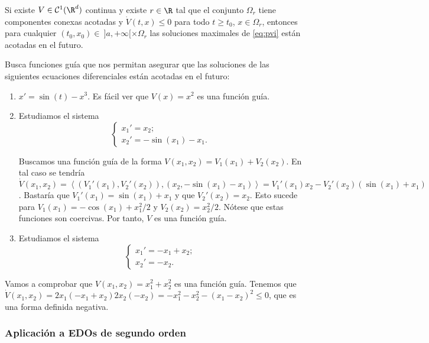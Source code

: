 \documentclass{article}
\begin{document}
\begin{theorem}
  \label{thm:guia:2}
  Si existe $V\in \mathcal{C}^1(\R^d)$ continua y existe $r \in \R$ tal que el conjunto $\Omega_r$
  tiene componentes conexas acotadas y $\dot{V}(t,x) \le 0$ para todo $t \ge t_0$, $x \in \Omega_r$,
  entonces para cualquier $(t_0, x_0) \in \ ]a, +\infty[ \times \Omega_r$ las soluciones maximales
  de \eqref{eq:pvi} están acotadas en el futuro.
\end{theorem}


\begin{ex} 
  Busca funciones guía que nos permitan asegurar que las soluciones de las siguientes ecuaciones
  diferenciales están acotadas en el futuro:
  \begin{enumerate}
  \item $x' = \sin(t) - x^{3}$. Es fácil ver que $V(x) = x^2$ es una función guía.
  \item Estudiamos el sistema
    \[
      \begin{cases}
        x_1' = x_2; \\
        x_2' = -\sin(x_1)-x_1.
      \end{cases}
    \]

    Buscamos una función guía de la forma $V(x_1, x_2) = V_1(x_1) + V_2(x_2)$. En tal caso se
    tendría
    $\dot{V}(x_1, x_2) = \left\langle (V_1'(x_1), V_2'(x_2)), (x_2, -\sin(x_1) - x_1) \right\rangle
    = V_1'(x_1) x_2 - V_2'(x_2)(\sin(x_1) + x_1)$. Bastaría que $V_1'(x_1) = \sin(x_1) + x_1$ y que
    $V_2'(x_2) = x_2$. Esto sucede para $V_1(x_1) = - \cos(x_1) + x_1^2/ 2$ y
    $V_2(x_2) = x_2^2 / 2$. Nótese que estas funciones son coercivas. Por tanto, $V$ es una función
    guía.
  \item Estudiamos el sistema
    \[
      \begin{cases}
        x_1' = -x_1 + x_2; \\
        x_2' = -x_2.
      \end{cases}
    \]
  \end{enumerate}
  Vamos a comprobar que $V(x_1, x_2) = x_1^2 + x_2^2$ es una función guía. Tenemos que
  $\dot{V}(x_1, x_2) = 2x_1(-x_1+x_2) 2x_2(-x_2) = - x_1^2 - x_2^2 - (x_1-x_2)^2 \le 0$, que es una
  forma definida negativa.
\end{ex}


\subsubsection{Aplicación a EDOs de segundo orden}
\end{document}
